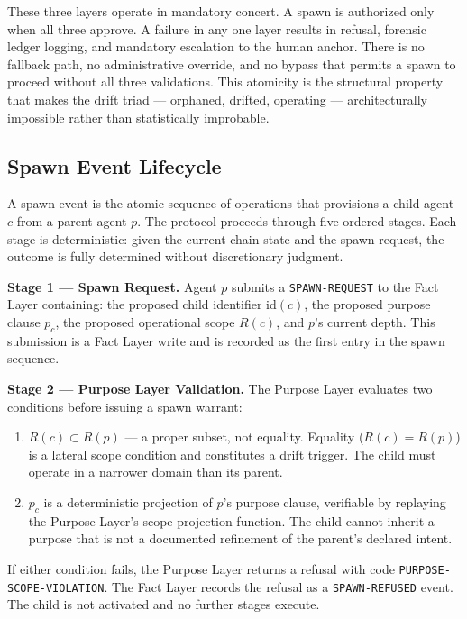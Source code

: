 These three layers operate in mandatory concert. A spawn is authorized only when all three approve. A failure in any one layer results in refusal, forensic ledger logging, and mandatory escalation to the human anchor. There is no fallback path, no administrative override, and no bypass that permits a spawn to proceed without all three validations. This atomicity is the structural property that makes the drift triad — orphaned, drifted, operating — architecturally impossible rather than statistically improbable.

\subsection{Spawn Event Lifecycle}

A spawn event is the atomic sequence of operations that provisions a child agent $c$ from a parent agent $p$. The protocol proceeds through five ordered stages. Each stage is deterministic: given the current chain state and the spawn request, the outcome is fully determined without discretionary judgment.

\bigskip
\noindent\textbf{Stage 1 — Spawn Request.} Agent $p$ submits a \texttt{SPAWN-REQUEST} to the Fact Layer containing: the proposed child identifier $\mathrm{id}(c)$, the proposed purpose clause $p_c$, the proposed operational scope $R(c)$, and $p$'s current depth. This submission is a Fact Layer write and is recorded as the first entry in the spawn sequence.

\bigskip
\noindent\textbf{Stage 2 — Purpose Layer Validation.} The Purpose Layer evaluates two conditions before issuing a spawn warrant:

\begin{enumerate}
  \item[(PL-V1)] $R(c) \subset R(p)$ — a proper subset, not equality. Equality ($R(c) = R(p)$) is a lateral scope condition and constitutes a drift trigger. The child must operate in a narrower domain than its parent.
  \item[(PL-V2)] $p_c$ is a deterministic projection of $p$'s purpose clause, verifiable by replaying the Purpose Layer's scope projection function. The child cannot inherit a purpose that is not a documented refinement of the parent's declared intent.
\end{enumerate}

If either condition fails, the Purpose Layer returns a refusal with code \texttt{PURPOSE-SCOPE-VIOLATION}. The Fact Layer records the refusal as a \texttt{SPAWN-REFUSED} event. The child is not activated and no further stages execute.

